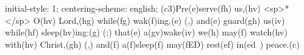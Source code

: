 initial-style: 1;
centering-scheme: english;
(c3)Pre(e)serve(fh) us,(hv) <sp>*</sp> O(hv) Lord,(hg) while(fg) wak(f)ing,(e) (,) and(e) guard(gh) us(iv) while(hf) sleep(hv)ing:(g) (;) that(e) a(gv)wake(iv) we(h) may(f) watch(hv) with(hv) Christ,(gh) (,) and(f) a(f)sleep(f) may(fED) rest(ef) in(ed~) peace.(c)
